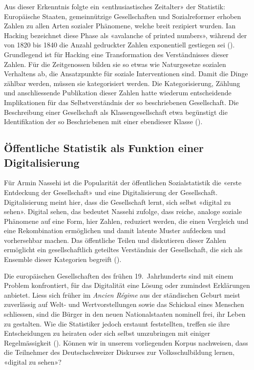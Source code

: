 Aus dieser Erkenntnis folgte ein «enthusiastisches Zeitalter» der Statistik: Europäische Staaten, gemeinnützige Gesellschaften und Sozialreformer erhoben Zahlen zu allen Arten sozialer Phänomene, welche breit rezipiert wurden. Ian Hacking bezeichnet diese Phase als «avalanche of printed numbers», während der von 1820 bis 1840 die Anzahl gedruckter Zahlen  exponentiell gestiegen sei (\cite[282]{hacking_biopower_1982}). Grundlegend ist für Hacking eine Transformation des Verständnisses dieser Zahlen. Für die Zeitgenossen bilden sie so etwas wie Naturgesetze sozialen Verhaltens ab, die Ansatzpunkte für soziale Interventionen sind. Damit die Dinge zählbar werden, müssen sie kategorisiert werden. Die Kategorisierung, Zählung und anschliessende Publikation dieser Zahlen hatte wiederum entscheidende Implikationen für das Selbstverständnis der so beschriebenen Gesellschaft. Die Beschreibung einer Gesellschaft als Klassengesellschaft etwa begünstigt die Identifikation der so Beschriebenen mit einer ebendieser Klasse (\cite{hacking_biopower_1982}).

\subsection{Öffentliche Statistik als Funktion einer Digitalisierung}

Für Armin Nassehi ist die Popularität der öffentlichen Sozialstatistik die «erste Entdeckung der Gesellschaft» und eine Digitalisierung der Gesellschaft. Digitalisierung meint hier, dass die Gesellschaft lernt, sich selbst «digital zu sehen». Digital sehen, das bedeutet Nassehi zufolge, dass reiche, analoge soziale Phänomene auf eine Form, hier Zahlen, reduziert werden, die einen Vergleich und eine Rekombination ermöglichen und damit latente Muster aufdecken und vorhersehbar machen. Das öffentliche Teilen und diskutieren dieser Zahlen ermöglicht ein gesellschaftlich geteiltes Verständnis der Gesellschaft, die sich als Ensemble dieser Kategorien begreift (\cite[32-36]{nassehi_muster_2019}).

Die europäischen Gesellschaften des frühen 19.~Jahrhunderts sind mit einem Problem konfrontiert, für das Digitalität eine Lösung oder zumindest Erklärungen anbietet. Liess sich früher im \textit{Ancien Régime} aus der ständischen Geburt meist zuverlässig auf Welt- und Wertvorstellungen sowie das Schicksal eines Menschen schliessen, sind die Bürger in den neuen Nationalstaaten nominell frei, ihr Leben zu gestalten. Wie die Statistiker jedoch erstaunt feststellten, treffen sie ihre Entscheidungen zu heiraten oder sich selbst umzubringen mit einiger Regelmässigkeit (\cite[44-47]{nassehi_muster_2019}). Können wir in unserem vorliegenden Korpus nachweisen, dass die Teilnehmer des Deutschschweizer Diskurses zur Volksschulbildung lernen, «digital zu sehen»?

